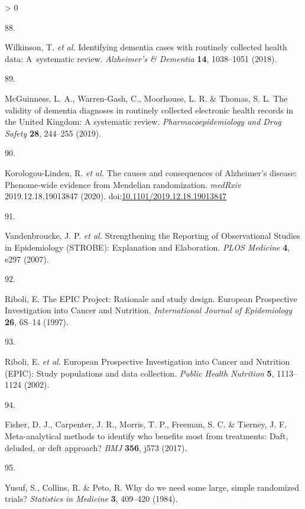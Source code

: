 \documentclass[a4paper, twoside]{templates/ociamthesis}
\newlength{\cslhangindent}
\newlength{\csllabelwidth}
\newenvironment{CSLReferences}[3] %
 {%
  \setlength{\parindent}{0pt}
  \ifodd #1 \everypar{\setlength{\hangindent}{\cslhangindent}}\ignorespaces\fi
  \ifnum #2 > 0
  \setlength{\parskip}{#2\baselineskip}
  \fi
 }%
 {}
\newcommand{\CSLLeftMargin}[1]{\parbox[t]{\maxof{\widthof{#1}}{\csllabelwidth}}{#1}}
\newcommand{\CSLRightInline}[1]{\parbox[t]{\linewidth - \csllabelwidth}{#1}}
\begin{document}
\begin{CSLReferences}{0}{0}
\leavevmode\hypertarget{ref-wilkinson2018}{}%
\CSLLeftMargin{88. }
\CSLRightInline{Wilkinson, T. \emph{et al.} Identifying dementia cases with routinely collected health data: {A}~systematic review. \emph{Alzheimer's \& Dementia} \textbf{14}, 1038--1051 (2018).}

\leavevmode\hypertarget{ref-mcguinness2019b}{}%
\CSLLeftMargin{89. }
\CSLRightInline{McGuinness, L. A., Warren-Gash, C., Moorhouse, L. R. \& Thomas, S. L. The validity of dementia diagnoses in routinely collected electronic health records in the {United Kingdom}: {A} systematic review. \emph{Pharmacoepidemiology and Drug Safety} \textbf{28}, 244--255 (2019).}

\leavevmode\hypertarget{ref-korologou-linden2020}{}%
\CSLLeftMargin{90. }
\CSLRightInline{Korologou-Linden, R. \emph{et al.} The causes and consequences of {Alzheimer}'s disease: Phenome-wide evidence from {Mendelian} randomization. \emph{medRxiv} 2019.12.18.19013847 (2020). doi:\href{https://doi.org/10.1101/2019.12.18.19013847}{10.1101/2019.12.18.19013847}}

\leavevmode\hypertarget{ref-vandenbroucke2007}{}%
\CSLLeftMargin{91. }
\CSLRightInline{Vandenbroucke, J. P. \emph{et al.} Strengthening the {Reporting} of {Observational Studies} in {Epidemiology} ({STROBE}): {Explanation} and {Elaboration}. \emph{PLOS Medicine} \textbf{4}, e297 (2007).}

\leavevmode\hypertarget{ref-riboli1997}{}%
\CSLLeftMargin{92. }
\CSLRightInline{Riboli, E. The {EPIC Project}: Rationale and study design. {European Prospective Investigation} into {Cancer} and {Nutrition}. \emph{International Journal of Epidemiology} \textbf{26}, 6S--14 (1997).}

\leavevmode\hypertarget{ref-riboli2002}{}%
\CSLLeftMargin{93. }
\CSLRightInline{Riboli, E. \emph{et al.} European {Prospective Investigation} into {Cancer} and {Nutrition} ({EPIC}): Study populations and data collection. \emph{Public Health Nutrition} \textbf{5}, 1113--1124 (2002).}

\leavevmode\hypertarget{ref-fisher2017}{}%
\CSLLeftMargin{94. }
\CSLRightInline{Fisher, D. J., Carpenter, J. R., Morris, T. P., Freeman, S. C. \& Tierney, J. F. Meta-analytical methods to identify who benefits most from treatments: Daft, deluded, or deft approach? \emph{BMJ} \textbf{356}, j573 (2017).}

\leavevmode\hypertarget{ref-yusuf1984}{}%
\CSLLeftMargin{95. }
\CSLRightInline{Yusuf, S., Collins, R. \& Peto, R. Why do we need some large, simple randomized trials? \emph{Statistics in Medicine} \textbf{3}, 409--420 (1984).}


\end{CSLReferences}
\end{document}

